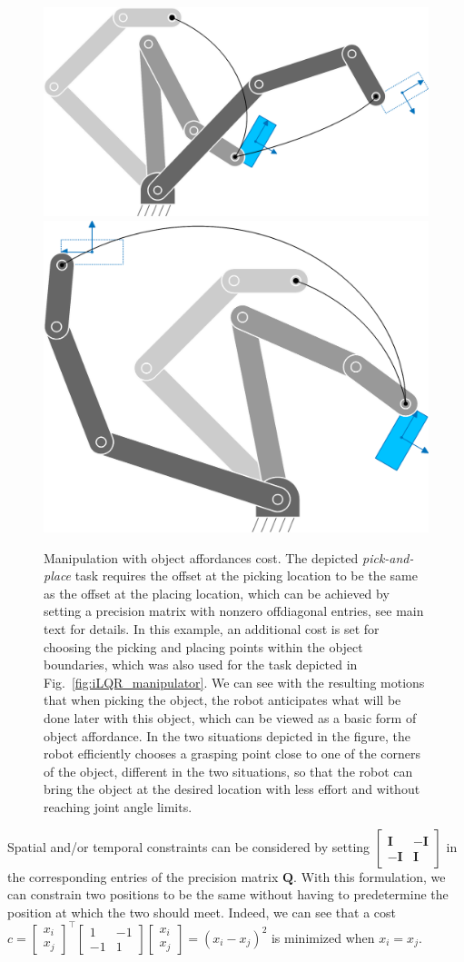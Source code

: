 \documentclass[10pt,a4paper]{article} %
\newcommand{\trsp}{{\scriptscriptstyle\top}}
\begin{document}
\begin{figure}
\centering
\includegraphics[width=.3\textwidth]{images/iLQR_objAffordances01.png}\hspace{5mm}
\includegraphics[width=.2\textwidth]{images/iLQR_objAffordances02.png}\vspace{15mm}
\caption{\footnotesize
Manipulation with object affordances cost. The depicted \emph{pick-and-place} task requires the offset at the picking location to be the same as the offset at the placing location, which can be achieved by setting a precision matrix with nonzero offdiagonal entries, see main text for details. In this example, an additional cost is set for choosing the picking and placing points within the object boundaries, which was also used for the task depicted in Fig.~\ref{fig:iLQR_manipulator}. We can see with the resulting motions that when picking the object, the robot anticipates what will be done later with this object, which can be viewed as a basic form of object affordance. In the two situations depicted in the figure, the robot efficiently chooses a grasping point close to one of the corners of the object, different in the two situations, so that the robot can bring the object at the desired location with less effort and without reaching joint angle limits.
}
\label{fig:iLQR_manipulator_objAffordances}
\end{figure}

Spatial and/or temporal constraints can be considered by setting $\left[\begin{smallmatrix}\bm{I}&-\bm{I}\\-\bm{I}&\bm{I}\end{smallmatrix}\right]$ in the corresponding entries of the precision matrix $\bm{Q}$. With this formulation, we can constrain two positions to be the same without having to predetermine the position at which the two should meet. Indeed, we can see that a cost $c\!=\!\left[\begin{smallmatrix}x_i\\x_j\end{smallmatrix}\right]^\trsp\left[\begin{smallmatrix}1&-1\\-1&1\end{smallmatrix}\right]\left[\begin{smallmatrix}x_i\\x_j\end{smallmatrix}\right]\!=\!(x_i-x_j)^2$ is minimized when $x_i\!=\!x_j$.
\end{document}
